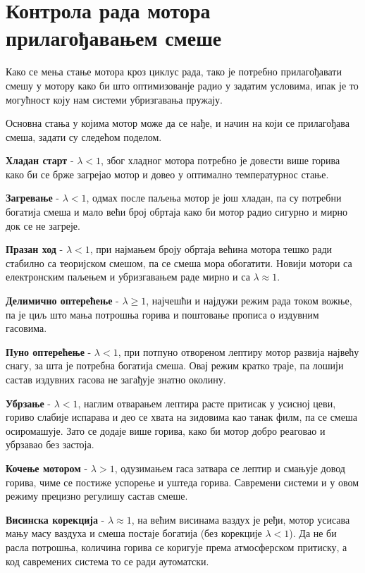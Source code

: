 \documentclass{report}
\begin{document}
\section{Контрола рада мотора прилагођавањем смеше}

Како се мења стање мотора кроз циклус рада, тако је потребно прилагођавати смешу у мотору
како би што оптимизованје радио у задатим условима, ипак је то могућност коју нам 
системи убризгавања пружају.

Основна стања у којима мотор може да се нађе, и начин на који се прилагођава смеша,
задати су следећом поделом.

\textbf{Хладан старт} - $\lambda < 1$, због хладног мотора потребно је довести више
горива како би се брже загрејао мотор и довео у оптимално температурнос стање.

\textbf{Загревање} - $\lambda < 1$, одмах после паљења мотор је још хладан, па су потребни
богатија смеша и мало већи број обртаја како би мотор радио сигурно и мирно док се не загреје.

\textbf{Празан ход} - $\lambda < 1$, при најмањем броју обртаја већина мотора тешко ради
стабилно са теоријском смешом, па се смеша мора обогатити. Новији мотори са електронским
паљењем и убризгавањем раде мирно и са $\lambda \approx 1$.

\textbf{Делимично оптерећење} - $\lambda \geq 1$, најчешћи и најдужи режим рада током вожње,
па је циљ што мања потрошња горива и поштовање прописа о издувним гасовима.

\textbf{Пуно оптерећење} - $\lambda < 1$, при потпуно отвореном лептиру
мотор развија највећу снагу, за шта је потребна богатија смеша. Овај режим кратко траје,
па лошији састав издувних гасова не загађује знатно околину.

\textbf{Убрзање} - $\lambda < 1$, наглим отварањем лептира расте притисак у усисној цеви,
гориво слабије испарава и део се хвата на зидовима као танак филм, па се смеша осиромашује.
Зато се додаје више горива, како би мотор добро реаговао и убрзавао без застоја.

\textbf{Кочење мотором} - $\lambda > 1$, одузимањем гаса затвара се лептир и смањује довод
горива, чиме се постиже успорење и уштеда горива. Савремени системи и у овом режиму
прецизно регулишу састав смеше.

\textbf{Висинска корекција} - $\lambda \approx 1$, на већим висинама ваздух је ређи, мотор
усисава мању масу ваздуха и смеша постаје богатија (без корекције $\lambda < 1$). Да не би
расла потрошња, количина горива се коригује према атмосферском притиску, а код савремених
система то се ради аутоматски.
\end{document}
